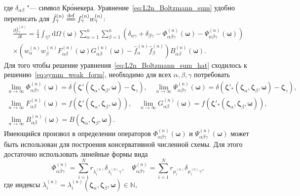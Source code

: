 \documentclass{article}
\newcommand{\dd}{\mathrm{d}}
\newcommand{\pder}[2][]{\frac{\partial#1}{\partial#2}}
\newcommand{\bzeta}{\boldsymbol{\zeta}}
\newcommand{\bomega}{\boldsymbol{\omega}}
\newcommand{\eqdef}{\overset{\mathrm{def}}{=\joinrel=}}
\begin{document}
где \(\delta_{\alpha\beta}\) "--- символ Кр\'{о}некера. Уравнение~\eqref{eq:L2n_Boltzmann_sum}
удобно переписать для \(\hat{f}^{(n)}_\gamma \eqdef f^{(n)}_\gamma w^{(n)}_\gamma\):
\begin{multline}\label{eq:L2n_Boltzmann_sum_hat}
    \pder[\hat{f}^{(n)}_\gamma]{t} =
        \frac14\int_{\mathbb{S}^2}\dd\Omega(\bomega) \sum_{\alpha=1}^n \sum_{\beta=1}^n
        \left(\delta_{\alpha\gamma} + \delta_{\beta\gamma}
            - \Phi^{(n)}_{\alpha\beta\gamma}(\bomega) - \Psi^{(n)}_{\alpha\beta\gamma}(\bomega)\right) \\
        \times\left(w^{(n)}_\alpha w^{(n)}_\beta F^{(n)}_{\alpha\beta}(\bomega)G^{(n)}_{\alpha\beta}(\bomega)
            - \hat{f}^{(n)}_\alpha \hat{f}^{(n)}_\beta\right)
        B^{(n)}_{\alpha\beta}(\bomega).
\end{multline}
Для того чтобы решение уравнения~\eqref{eq:L2n_Boltzmann_sum_hat} сходилось к решению~\eqref{eq:symm_weak_form},
необходимо для всех \(\alpha,\beta,\gamma\) потребовать
\begin{gather}
    \lim_{n\to\infty} \Phi^{(n)}_{\alpha\beta\gamma}(\bomega) =
        \delta(\bzeta'(\bzeta_\alpha,\bzeta_\beta,\bomega)-\bzeta_\gamma), \quad
    \lim_{n\to\infty} \Psi^{(n)}_{\alpha\beta\gamma}(\bomega) =
        \delta(\bzeta'_*(\bzeta_\alpha,\bzeta_\beta,\bomega)-\bzeta_\gamma), \label{eq:PhiPsi_limit}\\
    \lim_{n\to\infty} F^{(n)}_{\alpha\beta}(\bomega) =
        f(\bzeta'(\bzeta_\alpha,\bzeta_\beta,\bomega)), \quad
    \lim_{n\to\infty} G^{(n)}_{\alpha\beta}(\bomega) =
        f(\bzeta'_*(\bzeta_\alpha,\bzeta_\beta,\bomega)), \label{eq:FG_limit}\\
    \lim_{n\to\infty} B^{(n)}_{\alpha\beta}(\bomega) =
        B(\bzeta_\alpha,\bzeta_\beta,\bomega). \label{eq:B_limit}
\end{gather}
Имеющийся произвол в определении операторов \(\Phi^{(n)}_{\alpha\beta\gamma}(\bomega)\) и \(\Psi^{(n)}_{\alpha\beta\gamma}(\bomega)\)
может быть использован для построения консервативной численной схемы.
Для этого достаточно использовать линейные формы вида
\begin{equation}\label{conservative_scheme}
    \Phi^{(n)}_{\alpha\beta\gamma} = \sum_{i=1}^N r_{\lambda^{(n)}_i} \delta_{\lambda^{(n)}_i\gamma}, \quad
    \Psi^{(n)}_{\alpha\beta\gamma} = \sum_{i=1}^N r_{\mu^{(n)}_i} \delta_{\mu^{(n)}_i\gamma},
\end{equation}
где индексы \(\lambda^{(n)}_i=\lambda^{(n)}_i(\bzeta_\alpha,\bzeta_\beta,\bomega)\in\mathbb{N}\),
\end{document}
